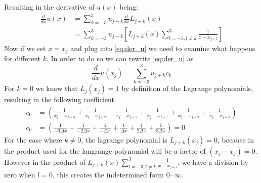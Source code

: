 Resulting in the derivative of $u(x)$ being:
\begin{equation}
	\begin{aligned}
		\frac{d}{dx}u(x) & = \sum_{k=-3}^3 u_{j+k} \frac{d}{dx}L_{j+k}(x)                                                  \\
		                 & = \sum_{k=-3}^3 u_{j+k} \left[ L_{j+k}(x) \sum_{l=-3, l \neq k}^3 \frac{1}{x - x_{j+l}} \right]
	\end{aligned}
	\label{eq:der_u}
\end{equation}
Now if we set $x=x_j$ and plug into \eqref{eq:der_u} we need to examine what happens for different $k$. In order to do so we can rewrite \eqref{eq:der_u} as
\begin{equation}
	\frac{d}{dx}u(x_j) = \sum_{k=-3}^3 u_{j+k} c_k
	\label{eq:c_k}
\end{equation}
For $k=0$ we know that $L_j(x_j) = 1$ by definition of the Lagrange polynomials, resulting in the following coefficient
\begin{equation}
	\begin{aligned}
		c_0 & = \left ( \frac{1}{x_j - x_{j-3}} +  \frac{1}{x_j - x_{j-2}} + \frac{1}{x_j - x_{j-1}} + \frac{1}{x_j - x_{j+1}} + \frac{1}{x_j - x_{j+2}} +\frac{1}{x_j - x_{j+3}} \right) \\
		c_0 & = \left ( \frac{1}{-3\Delta x}  + \frac{1}{-2\Delta x} + \frac{1}{-\Delta x} + \frac{1}{\Delta x} + \frac{1}{2 \Delta x} + \frac{1}{3 \Delta x} \right) = 0
	\end{aligned}
	\label{eq:c_0}
\end{equation}
For the case where $k \neq 0$, the lagrange polynomial is $L_{j+k}(x_j) = 0$, because in the product used for the langrange polynomial will be a factor of $(x_j - x_j) = 0$. However in the product of $L_{j+k}(x) \sum_{l=-3, l \neq k}^3 \frac{1}{x - x_{j+l}} $, we have a division by zero when $l = 0$, this creates the indetermined form $0 \cdot \infty$. \newline
